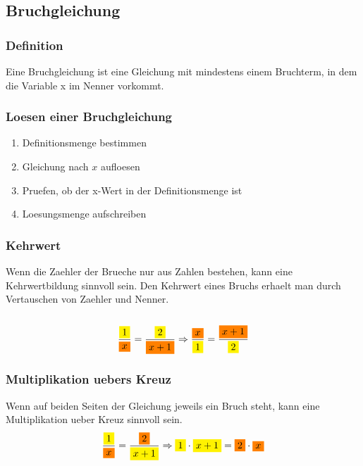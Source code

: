 \begin{multicols}{2}
    \subsection{Bruchgleichung}
    \vspace{-4mm}
    \subsubsection{Definition}
    \vspace{-4mm}
    Eine Bruchgleichung ist eine Gleichung mit mindestens einem Bruchterm, in dem die Variable x im Nenner vorkommt.
    \subsubsection{Loesen einer Bruchgleichung}
    \vspace{-4mm}
    \begin{enumerate}
        \item Definitionsmenge bestimmen
        \item Gleichung nach $x$ aufloesen
        \item Pruefen, ob der x-Wert in der Definitionsmenge ist
        \item Loesungsmenge aufschreiben
    \end{enumerate}
    \subsubsection{Kehrwert}
    \vspace{-4mm}
    Wenn die Zaehler der Brueche nur aus Zahlen bestehen, kann eine Kehrwertbildung sinnvoll sein.
    Den Kehrwert eines Bruchs erhaelt man durch Vertauschen von Zaehler und Nenner.\\~\\
    \[\frac{{\colorbox{yellow}{$1$}}}{{\colorbox{orange}{$x$}}} = \frac{{\colorbox{yellow}{$2$}}}{{\colorbox{orange}{$x+1$}}} \Rightarrow  \frac{{\colorbox{orange}{$x$}}}{{\colorbox{yellow}{$1$}}} = \frac{{\colorbox{orange}{$x+1$}}}{{\colorbox{yellow}{$2$}}}\]


    \subsubsection{Multiplikation uebers Kreuz}
    \vspace{-4mm}
    Wenn auf beiden Seiten der Gleichung jeweils ein Bruch steht, kann eine Multiplikation ueber Kreuz sinnvoll sein.
    \[\frac{{\colorbox{yellow}{$1$}}}{{\colorbox{orange}{$x$}}} = \frac{{\colorbox{orange}{$2$}}}{{\colorbox{yellow}{$x+1$}}} \Rightarrow {\colorbox{yellow}{$1$}} \cdot {\colorbox{yellow}{$x+1$}} = {\colorbox{orange}{$2$}} \cdot {\colorbox{orange}{$x$}}\]



\end{multicols}
